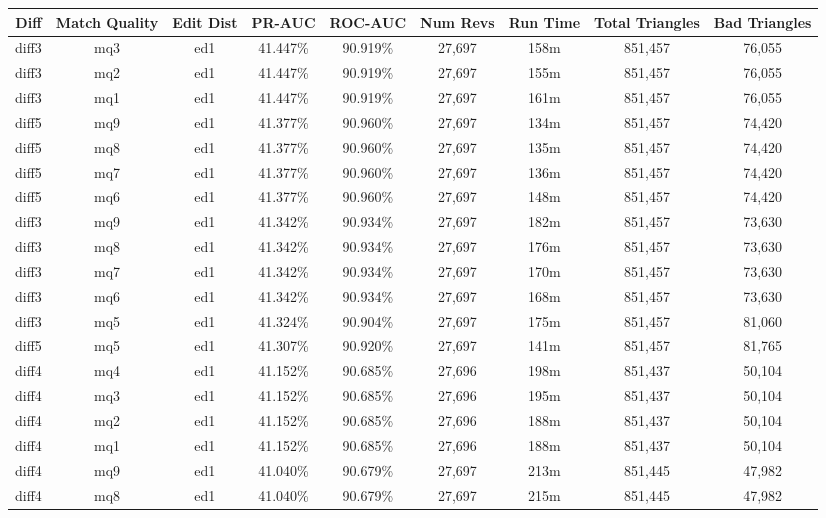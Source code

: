 \begin{sidewaystable}[!ph]
  \begin{center}
    \begin{tabular}{|c|c|c||c|c||c|c|c|c|}
\hline
Diff & Match Quality & Edit Dist
        & PR-AUC & ROC-AUC
        & Num Revs & Run Time
        & Total Triangles & Bad Triangles \\
\hline
\hline
diff3 & mq3 & ed1 & 41.447\% & 90.919\% & 27,697 & 158m & 851,457 & 76,055 \\
diff3 & mq2 & ed1 & 41.447\% & 90.919\% & 27,697 & 155m & 851,457 & 76,055 \\
diff3 & mq1 & ed1 & 41.447\% & 90.919\% & 27,697 & 161m & 851,457 & 76,055 \\
diff5 & mq9 & ed1 & 41.377\% & 90.960\% & 27,697 & 134m & 851,457 & 74,420 \\
diff5 & mq8 & ed1 & 41.377\% & 90.960\% & 27,697 & 135m & 851,457 & 74,420 \\
diff5 & mq7 & ed1 & 41.377\% & 90.960\% & 27,697 & 136m & 851,457 & 74,420 \\
diff5 & mq6 & ed1 & 41.377\% & 90.960\% & 27,697 & 148m & 851,457 & 74,420 \\
diff3 & mq9 & ed1 & 41.342\% & 90.934\% & 27,697 & 182m & 851,457 & 73,630 \\
diff3 & mq8 & ed1 & 41.342\% & 90.934\% & 27,697 & 176m & 851,457 & 73,630 \\
diff3 & mq7 & ed1 & 41.342\% & 90.934\% & 27,697 & 170m & 851,457 & 73,630 \\
diff3 & mq6 & ed1 & 41.342\% & 90.934\% & 27,697 & 168m & 851,457 & 73,630 \\
diff3 & mq5 & ed1 & 41.324\% & 90.904\% & 27,697 & 175m & 851,457 & 81,060 \\
diff5 & mq5 & ed1 & 41.307\% & 90.920\% & 27,697 & 141m & 851,457 & 81,765 \\
diff4 & mq4 & ed1 & 41.152\% & 90.685\% & 27,696 & 198m & 851,437 & 50,104 \\
diff4 & mq3 & ed1 & 41.152\% & 90.685\% & 27,696 & 195m & 851,437 & 50,104 \\
diff4 & mq2 & ed1 & 41.152\% & 90.685\% & 27,696 & 188m & 851,437 & 50,104 \\
diff4 & mq1 & ed1 & 41.152\% & 90.685\% & 27,696 & 188m & 851,437 & 50,104 \\
diff4 & mq9 & ed1 & 41.040\% & 90.679\% & 27,697 & 213m & 851,445 & 47,982 \\
diff4 & mq8 & ed1 & 41.040\% & 90.679\% & 27,697 & 215m & 851,445 & 47,982 \\

\end{tabular}
\end{center}
\end{sidewaystable}
